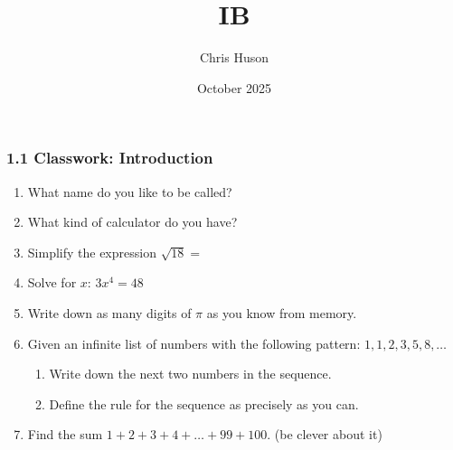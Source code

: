 \documentclass[12pt, twoside]{article}
\title{IB}
\author{Chris Huson}
\date{October 2025}
\begin{document}
\subsubsection*{1.1 Classwork: Introduction}
\begin{enumerate}[itemsep=0.5cm]
\item What name do you like to be called? \vspace{0.5cm}
\item What kind of calculator do you have? \vspace{0.5cm}

\item Simplify the expression $\sqrt{18}=$ \vspace{0.5cm}

\item Solve for $x$: $3x^4=48$ \vspace{2cm}
\item Write down as many digits of $\pi$ as you know from memory. \vspace{0.5cm}
\item Given an infinite list of numbers with the following pattern: $1, 1, 2, 3, 5, 8, \ldots$
\begin{enumerate}
    \item Write down the next two numbers in the sequence. \vspace{0.5cm}
    \item Define the rule for the sequence as precisely as you can.
\end{enumerate} \vspace{3cm}
\item Find the sum $1+2+3+4+\ldots + 99+100$. (be clever about it) \vspace{2cm}

       
\end{enumerate}
\end{document}
